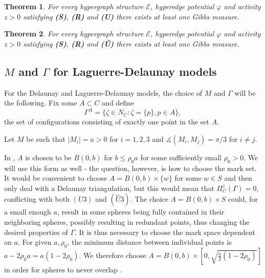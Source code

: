 \documentclass[12pt,a4paper]{article}
\newtheorem{theorem}{Theorem}
\theoremstyle{definition}
\theoremstyle{remark}
\theoremstyle{theorem}
\begin{document}

\begin{theorem}
	For every hypergraph structure $\mathcal E$, hyperedge potential $\varphi$ and activity $z>0$ satisfying \textbf{(S)}, \textbf{(R)} and \textbf{(U)} there exists at least one Gibbs measure.
\end{theorem}

\begin{theorem}
	For every hypergraph structure $\mathcal E$, hyperedge potential $\varphi$ and activity $z>0$ satisfying \textbf{(S)}, \textbf{(R)} and \textbf{(\^{U})} there exists at least one Gibbs measure.
\end{theorem}







\subsection{$M$ and $\Gamma$ for Laguerre-Delaunay models}\label{sec:MGamma}
For the Delaunay and Laguerre-Delaunay models, the choice of $M$ and $\Gamma$ will be the following. Fix some $A \subset C$ and define
$$\Gamma^A = \{\zeta \in N_C: \zeta = \{p\}, p \in A\},$$
the set of configurations consisting of exactly one point in the set $A$.

Let $M$ be such that $|M_i| = a > 0$ for $i=1,2,3$ and $\measuredangle(M_i,M_j) = \pi / 3$ for $i\neq j$.

In \cite{DDG12}, $A$ is chosen to be $B(0,b)$ for $b\leq \rho_0 a$ for some  sufficiently small $\rho_0 >0$. We will use this form as well - the question, however, is how to choose the mark set. It would be convenient to choose $A=B(0,b)\times\{w\}$ for some $w\in S$ and then only deal with a Delaunay triangulation, but this would mean that $\Pi^z_C(\Gamma) = 0$, conflicting with both $(U3)$ and $(\hat U3)$. The choice $A=B(0,b)\times S$ could, for a small enough $a$, result in some spheres being fully contained in their neighboring spheres, possibly resulting in redundant points, thus changing the desired properties of $\Gamma$. It is thus necessary to choose the mark space dependent on $a$. For given $a,\rho_0$, the minimum distance between individual points is $a-2\rho_0 a = a(1-2\rho_0)$. We therefore choose $A = B(0,b)\times [0, \sqrt{\frac a2(1-2\rho_0)}]$ in order for spheres to never overlap . 
\end{document}

